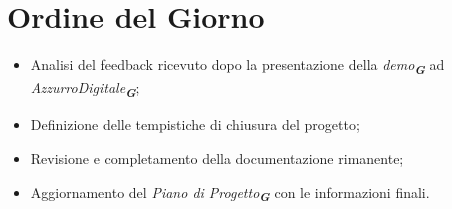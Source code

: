 

\section{Ordine del Giorno}

\begin{itemize}
    \item Analisi del feedback ricevuto dopo la presentazione della \emph{demo}\textsubscript{\textit{\textbf{G}}} ad \emph{AzzurroDigitale}\textsubscript{\textit{\textbf{G}}};
    
    \item Definizione delle tempistiche di chiusura del progetto;

    \item Revisione e completamento della documentazione rimanente;
    
    \item Aggiornamento del \emph{Piano di Progetto}\textsubscript{\textit{\textbf{G}}} con le informazioni finali.
\end{itemize}
    
